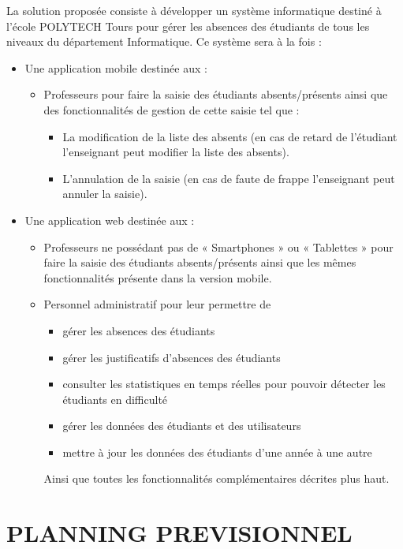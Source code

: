\documentclass[overfullbox]{polytech/polytech}
\begin{document}
 La solution proposée consiste à développer un système informatique destiné à l’école POLYTECH Tours pour gérer les absences des étudiants de tous les niveaux du département Informatique.
Ce système sera à la fois :
\begin{itemize}
 \item Une application mobile destinée aux :
\begin{itemize}
	\item Professeurs pour faire la saisie des étudiants absents/présents ainsi que des fonctionnalités de gestion de cette saisie tel que :
		\begin{itemize}
			\item La modification de la liste des absents (en cas de retard de l’étudiant l’enseignant peut modifier la liste des absents).
			\item L’annulation de la saisie (en cas de faute de frappe l’enseignant peut annuler la saisie).
		\end{itemize}
\end{itemize}
\item Une application web destinée aux :
 \begin{itemize}
	\item Professeurs ne possédant pas de « Smartphones » ou « Tablettes » pour faire la saisie des étudiants absents/présents ainsi que les mêmes fonctionnalités présente dans la version mobile.
	
	\item Personnel administratif pour leur permettre de
		\begin{itemize}
        	\item gérer les absences des étudiants
			\item gérer les justificatifs d'absences des étudiants
       		 \item consulter les statistiques en temps réelles pour pouvoir détecter les étudiants en difficulté
             \item gérer les données des étudiants et des utilisateurs
             \item mettre à jour les données des étudiants d'une année à une autre
            \end{itemize}
     Ainsi que toutes les fonctionnalités complémentaires décrites plus haut.
   \end{itemize}
\end{itemize}  



\section{PLANNING PREVISIONNEL}
\end{document}
